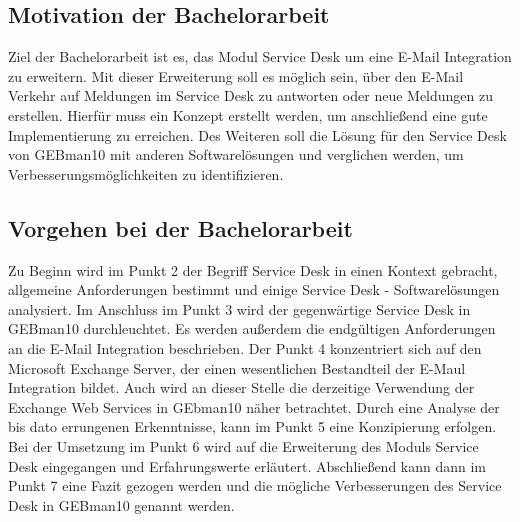 \subsection{Motivation der Bachelorarbeit}
\noindent
Ziel der Bachelorarbeit ist es, das Modul Service Desk um eine E-Mail Integration zu erweitern. Mit dieser Erweiterung soll es möglich sein, über den E-Mail Verkehr auf Meldungen im Service Desk zu antworten oder neue Meldungen zu erstellen. Hierfür muss ein Konzept erstellt werden, um anschließend eine gute Implementierung zu erreichen.\newline
Des Weiteren soll die Lösung für den Service Desk von GEBman10 mit anderen Softwarelösungen und verglichen werden, um Verbesserungsmöglichkeiten zu identifizieren. 


\subsection{Vorgehen bei der Bachelorarbeit}
\noindent
Zu Beginn wird im Punkt 2 der Begriff Service Desk in einen Kontext gebracht, allgemeine Anforderungen bestimmt und einige Service Desk - Softwarelösungen analysiert. Im Anschluss im Punkt 3 wird der gegenwärtige Service Desk in GEBman10 durchleuchtet. Es werden außerdem die endgültigen Anforderungen an die E-Mail Integration beschrieben. Der Punkt 4 konzentriert sich auf den Microsoft Exchange Server, der einen wesentlichen Bestandteil der E-Maul Integration bildet. Auch wird an dieser Stelle die derzeitige Verwendung der Exchange Web Services in GEbman10 näher betrachtet.  Durch eine Analyse der bis dato errungenen Erkenntnisse, kann im Punkt 5 eine Konzipierung erfolgen. Bei der Umsetzung im Punkt 6 wird auf die Erweiterung des Moduls Service Desk eingegangen und Erfahrungswerte erläutert. Abschließend kann dann im Punkt 7 eine Fazit gezogen werden und die mögliche Verbesserungen des Service Desk in GEBman10 genannt werden.
